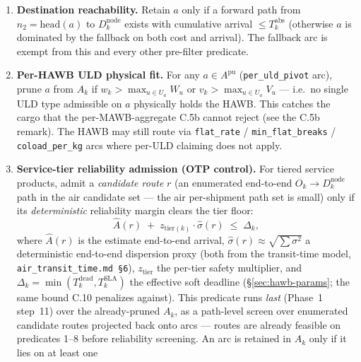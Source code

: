 \documentclass[11pt,a4paper]{article}
\theoremstyle{definition}
\begin{document}
\begin{enumerate}[noitemsep]
        preceding ground arc); (ii) if $a$ is an air arc, set its head window
        $t^{\text{lo}}_{n_2} = t^{\text{hi}}_{n_2} = \text{ETA}_a$;
        (iii) otherwise propagate the window forward.
  \item \textbf{Destination reachability.} Retain $a$ only if a forward path
        from $n_2 = \text{head}(a)$ to $D_k^{\text{node}}$ exists with cumulative
        arrival $\leq T_k^{\text{abs}}$ (otherwise $a$ is dominated by the
        fallback on both cost and arrival). The fallback arc is exempt from this
        and every other pre-filter predicate.
  \item \textbf{Per-HAWB ULD physical fit.} For any $a \in A^{\text{pu}}$
        (\texttt{per\_uld\_pivot} arc), prune $a$ from $A_k$ if
        $w_k > \max_{u \in U_a} W_u$ or $v_k > \max_{u \in U_a} V_u$ ---
        i.e.\ no single ULD type admissible on $a$ physically holds the HAWB.
        This catches the cargo that the per-MAWB-aggregate C.5b cannot reject
        (see the C.5b remark). The HAWB may still route via
        \texttt{flat\_rate} / \texttt{min\_flat\_breaks} / \texttt{coload\_per\_kg}
        arcs where per-ULD claiming does not apply.
  \item \textbf{Service-tier reliability admission (OTP control).} For tiered
        service products, admit a \emph{candidate route} $r$ (an enumerated
        end-to-end $O_k \to D_k^{\text{node}}$ path in the air candidate set ---
        the air per-shipment path set is small) only if its \emph{deterministic}
        reliability margin clears the tier floor:
        \begin{equation}
          \hat{A}(r) \;+\; z_{\text{tier}(k)} \cdot \hat{\sigma}(r) \;\leq\; \Delta_k,
          \label{eq:tier-reliability-ok}
        \end{equation}
        where $\hat{A}(r)$ is the estimate end-to-end arrival, $\hat{\sigma}(r)
        \approx \sqrt{\sum \sigma^2}$ a deterministic end-to-end dispersion proxy
        (both from the transit-time model, \texttt{air\_transit\_time.md \S6}),
        $z_{\text{tier}}$ the per-tier safety multiplier, and $\Delta_k =
        \min(T_k^{\text{dead}}, T_k^{\text{SLA}})$ the effective soft deadline
        (\S\ref{sec:hawb-params}; the same bound C.10 penalizes against). This
        predicate runs \emph{last} (Phase~1 step~11) over the already-pruned $A_k$,
        as a path-level screen over enumerated candidate routes projected back onto
        arcs --- routes are already feasible on predicates 1--8 before reliability
        screening. An arc is retained in $A_k$ only if it lies on at least one

\end{enumerate}
\end{document}
